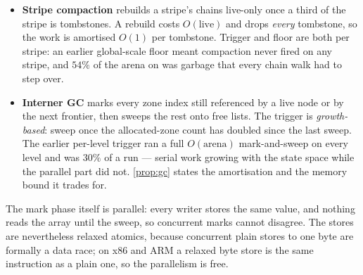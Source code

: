\begin{itemize}[leftmargin=1.2em, itemsep=2pt]
\item \textbf{Stripe compaction} rebuilds a stripe's chains live-only once a
      third of the stripe is tombstones.  A rebuild costs $O(\text{live})$ and
      drops \emph{every} tombstone, so the work is amortised $O(1)$ per
      tombstone.  Trigger and floor are both per stripe: an earlier global-scale
      floor meant compaction never fired on any stripe, and $54\%$ of the arena
      on  was garbage that every chain walk had to step over.

\item \textbf{Interner GC} marks every zone index still referenced by a live
      node or by the next frontier, then sweeps the rest onto free lists.  The
      trigger is \emph{growth-based}: sweep once the allocated-zone count has
      doubled since the last sweep.  The earlier per-level trigger ran a full
      $O(\text{arena})$ mark-and-sweep on every level and was $30\%$ of a
       run --- serial work growing with the state space while
      the parallel part did not.  \cref{prop:gc} states the amortisation and
      the memory bound it trades for.
\end{itemize}

The mark phase itself is parallel: every writer stores the same value, and
nothing reads the array until the sweep, so concurrent marks cannot disagree.
The stores are nevertheless relaxed atomics, because concurrent plain stores to
one byte are formally a data race; on x86 and ARM a relaxed byte store is the
same instruction as a plain one, so the parallelism is free.
